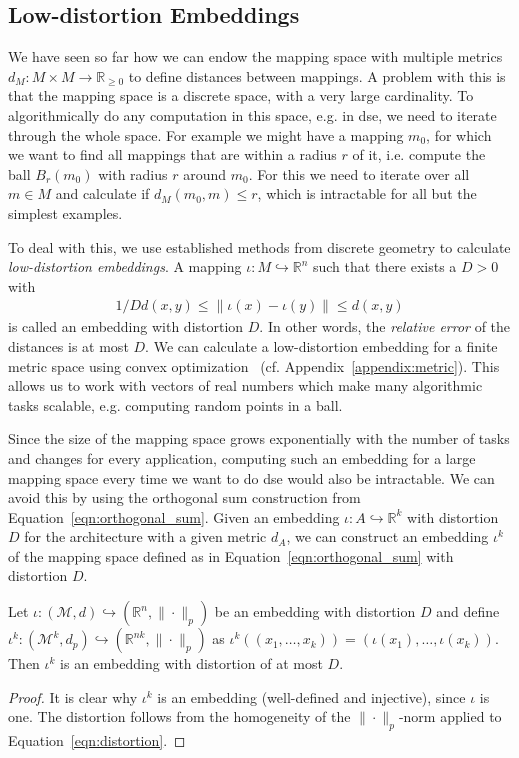 \subsection{Low-distortion Embeddings}

We have seen so far how we can endow the mapping space with multiple metrics $d_M : M \times M \rightarrow \mathbb{R}_{\geq 0}$ to define distances between mappings.
A problem with this is that the mapping space is a discrete space, with a very large cardinality.
To algorithmically do any computation in this space, e.g. in \ac{dse}, we need to iterate through the whole space.
For example we might have a mapping $m_0$, for which we want to find all mappings that are within a radius $r$ of it, i.e. compute the ball $B_r(m_0)$ with radius $r$ around $m_0$.
For this we need to iterate over all $m \in M$ and calculate if $d_M(m_0,m) \leq r$, which is intractable for all but the simplest examples.

To deal with this, we use established methods from discrete geometry to calculate \emph{low-distortion embeddings}.
A mapping $\iota : M \hookrightarrow \mathbb{R}^n$ such that there exists a $D > 0$ with
\begin{align}\label{eqn:distortion} 1/D d(x,y) \leq \| \iota(x) - \iota(y) \| \leq d(x,y) \end{align}
is called an embedding with distortion $D$.
In other words, the \emph{relative error} of the distances is at most $D$.
We can calculate a low-distortion embedding for a finite metric space using convex optimization~\cite{matouvsek} (cf. Appendix~\ref{appendix:metric}).
This allows us to work with vectors of real numbers which make many algorithmic tasks scalable, e.g. computing random points in a ball.

Since the size of the mapping space grows exponentially with the number of tasks and changes for every application, computing such an embedding for a large mapping space every time we want to do \ac{dse} would also be intractable.
We can avoid this by using the orthogonal sum construction from Equation~\ref{eqn:orthogonal_sum}.
Given an embedding $\iota : A \hookrightarrow \mathbb{R}^k$ with distortion $D$ for the architecture with a given metric $d_A$, we can construct an embedding $\iota^k$ of the mapping space defined as in Equation~\ref{eqn:orthogonal_sum} with distortion $D$.
\begin{theorem}
\label{thm:iotad}
Let $\iota: (\mathcal{M}, d) \hookrightarrow (\mathbb{R}^n, \| \cdot \|_p)$ be an embedding with distortion $D$ and define $\iota^{k} : (\mathcal{M}^k,d_p) \hookrightarrow (\mathbb{R}^{nk}, \| \cdot \|_p)$ as
$\iota^k ( (x_1,\ldots,x_k)) = (\iota(x_1),\ldots,\iota(x_k))$. Then $\iota^k$ is an embedding with distortion of at most $D$.
\begin{proof}
It is clear why $\iota^k$ is an embedding (well-defined and injective), since $\iota$ is one. The distortion follows from the homogeneity of the $\| \cdot \|_p$-norm applied to Equation~\ref{eqn:distortion}.
\end{proof}
\end{theorem}
	  
